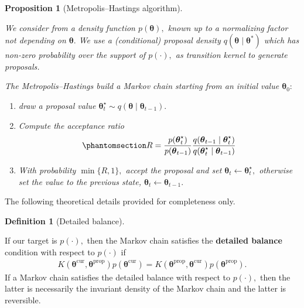 \documentclass[
  11pt,
  letterpaper,
]{scrbook}
\providecommand{\tightlist}{%
  \setlength{\itemsep}{0pt}\setlength{\parskip}{0pt}}
\theoremstyle{definition}
\theoremstyle{plain}
\newtheorem{proposition}{Proposition}[chapter]
\theoremstyle{plain}
\theoremstyle{plain}
\theoremstyle{definition}
\theoremstyle{definition}
\newtheorem{definition}{Definition}[chapter]
\theoremstyle{plain}
\newtheorem{proposition}{Proposition}[chapter]
\theoremstyle{plain}
\theoremstyle{remark}
\begin{document}
\begin{proposition}[Metropolis--Hastings
algorithm]\protect\hypertarget{prp-metropolis}{}\label{prp-metropolis}

We consider from a density function \(p(\boldsymbol{\theta}),\) known up
to a normalizing factor not depending on \(\boldsymbol{\theta}.\) We use
a (conditional) proposal density
\(q(\boldsymbol{\theta} \mid \boldsymbol{\theta}^*)\) which has non-zero
probability over the support of \(p(\cdot),\) as transition kernel to
generate proposals.

The Metropolis--Hastings build a Markov chain starting from an initial
value \(\boldsymbol{\theta}_0:\)

\begin{enumerate}
\def\labelenumi{\arabic{enumi}.}
\tightlist
\item
  draw a proposal value
  \(\boldsymbol{\theta}_t^{\star} \sim q(\boldsymbol{\theta} \mid \boldsymbol{\theta}_{t-1}).\)
\item
  Compute the acceptance ratio
  \begin{equation}\protect\phantomsection\label{eq-metropolis-ratio}{
  R = \frac{p(\boldsymbol{\theta}_t^{\star})}{p(\boldsymbol{\theta}_{t-1})}\frac{q(\boldsymbol{\theta}_{t-1} \mid \boldsymbol{\theta}_t^{\star} )}{q(\boldsymbol{\theta}_t^{\star} \mid \boldsymbol{\theta}_{t-1})}
  }\end{equation}
\item
  With probability \(\min\{R, 1\},\) accept the proposal and set
  \(\boldsymbol{\theta}_t \gets \boldsymbol{\theta}_t^{\star},\)
  otherwise set the value to the previous state,
  \(\boldsymbol{\theta}_t \gets \boldsymbol{\theta}_{t-1}.\)
\end{enumerate}

\end{proposition}

The following theoretical details provided for completeness only.

\begin{definition}[Detailed
balance]\protect\hypertarget{def-detailed-balance}{}\label{def-detailed-balance}

If our target is \(p(\cdot),\) then the Markov chain satisfies the
\textbf{detailed balance} condition with respect to \(p(\cdot)\) if
\begin{align*}
K(\boldsymbol{\theta}^{\text{cur}}, \boldsymbol{\theta}^{\text{prop}})p(\boldsymbol{\theta}^{\text{cur}}) = K(\boldsymbol{\theta}^{\text{prop}}, \boldsymbol{\theta}^{\text{cur}})p(\boldsymbol{\theta}^{\text{prop}}).
\end{align*} If a Markov chain satisfies the detailed balance with
respect to \(p(\cdot),\) then the latter is necessarily the invariant
density of the Markov chain and the latter is reversible.

\end{definition}
\end{document}
